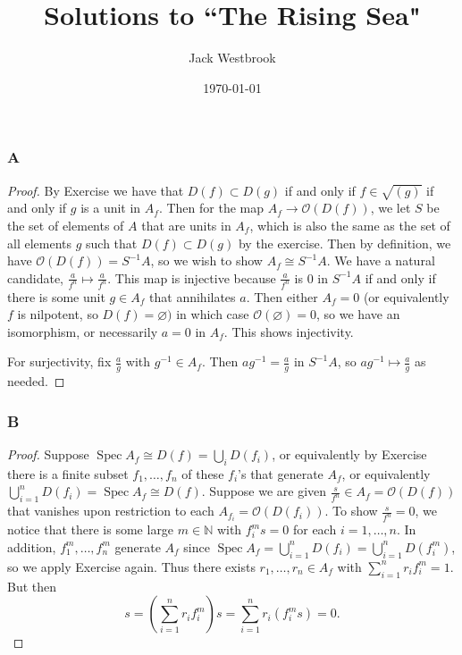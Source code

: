\documentclass{article}
\title{Solutions to ``The Rising Sea"}
\author{Jack Westbrook}
\date\today
\newcommand{\N}{\mathbb{N}}
\newcommand{\fO}{\mathscr{O}}
\DeclareMathOperator{\Spec}{\mathrm{Spec}}
\let\emptyset\varnothing
\theoremstyle{definition} %
\begin{document}
\maketitle %

\section{}
\subsection{}
\subsubsection{A}\label{4.1.A}
\begin{proof}
    By Exercise  %
    we have that $D(f)\subset D(g)$ if and only if $f\in \sqrt{(g)}$ if and only if $g$ is a unit in $A_f$. Then for the map $A_f \to \fO(D(f))$, we let $S$ be the set of elements of $A$ that are units in $A_f$, which is also the same as the set of all elements $g$ such that $D(f)\subset D(g)$ by the exercise. Then by definition, we have $\fO(D(f))=S^{-1}A$, so we wish to show $A_f \cong S^{-1}A$. We have a natural candidate, $\frac{a}{f^n}\mapsto \frac{a}{f^n}$. This map is injective because $\frac{a}{f^n}$ is $0$ in $S^{-1}A$ if and only if there is some unit $g\in A_f$ that annihilates $a$. Then either $A_f = 0$ (or equivalently $f$ is nilpotent, so $D(f)=\emptyset)$ in which case $\fO(\emptyset)=0$, so we have an isomorphism, or necessarily $a=0$ in $A_f$. This shows injectivity.

    For surjectivity, fix $\frac{a}{g}$ with $g^{-1}\in A_f$. Then ${ag^{-1}} = \frac{a}{g}$ in $S^{-1}A$, so $ag^{-1}\mapsto \frac{a}{g}$ as needed.
\end{proof}
\subsubsection{B}\label{4.1.B}
\begin{proof}
    Suppose $\Spec A_f \cong D(f)=\bigcup_i D(f_i)$, or equivalently by Exercise  %
    there is a finite subset $f_1, \dots, f_n$ of these $f_i$'s that generate $A_f$, or equivalently $\bigcup_{i=1}^n D(f_i)=\Spec A_f\cong  D(f)$. Suppose we are given $\frac{s}{f^n}\in A_f=\fO(D(f))$ that vanishes upon restriction to each $A_{f_i}=\fO(D(f_i))$. To show $\frac{s}{f^n}=0$, we notice that there is some large $m\in \N$ with $f_i^m s =0$ for each $i=1, \dots, n$. In addition, $f_1^m, \dots, f_n^m$ generate $A_f$ since $\Spec A_f = \bigcup_{i=1}^n D(f_i) = \bigcup_{i=1}^n D(f_i^m)$, so we apply Exercise  %
    again. Thus there exists $r_1, \dots, r_n \in A_f$ with $\sum_{i=1}^n r_i f_i^m =1$. But then
    \[
    s= \left( \sum_{i=1}^n r_i f_i^m\right) s=\sum_{i=1}^n r_i (f_i^m s)=0.
    \]
\end{proof}
\end{document}
